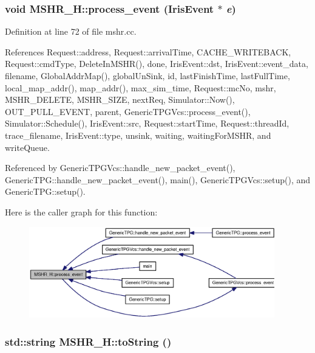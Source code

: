 \subsubsection[{process\_\-event}]{\setlength{\rightskip}{0pt plus 5cm}void MSHR\_\-H::process\_\-event ({\bf IrisEvent} $\ast$ {\em e})}\label{classMSHR__H_1dff946e7d92eae286b8f72df7dc0f03}




Definition at line 72 of file mshr.cc.

References Request::address, Request::arrivalTime, CACHE\_\-WRITEBACK, Request::cmdType, DeleteInMSHR(), done, IrisEvent::dst, IrisEvent::event\_\-data, filename, GlobalAddrMap(), globalUnSink, id, lastFinishTime, lastFullTime, local\_\-map\_\-addr(), map\_\-addr(), max\_\-sim\_\-time, Request::mcNo, mshr, MSHR\_\-DELETE, MSHR\_\-SIZE, nextReq, Simulator::Now(), OUT\_\-PULL\_\-EVENT, parent, GenericTPGVcs::process\_\-event(), Simulator::Schedule(), IrisEvent::src, Request::startTime, Request::threadId, trace\_\-filename, IrisEvent::type, unsink, waiting, waitingForMSHR, and writeQueue.

Referenced by GenericTPGVcs::handle\_\-new\_\-packet\_\-event(), GenericTPG::handle\_\-new\_\-packet\_\-event(), main(), GenericTPGVcs::setup(), and GenericTPG::setup().

Here is the caller graph for this function:\nopagebreak
\begin{figure}[H]
\begin{center}
\leavevmode
\includegraphics[width=303pt]{classMSHR__H_1dff946e7d92eae286b8f72df7dc0f03_icgraph}
\end{center}
\end{figure}
\subsubsection[{toString}]{\setlength{\rightskip}{0pt plus 5cm}std::string MSHR\_\-H::toString ()}\label{classMSHR__H_778e0a25bf58c2ccbe506a4c635f953f}




